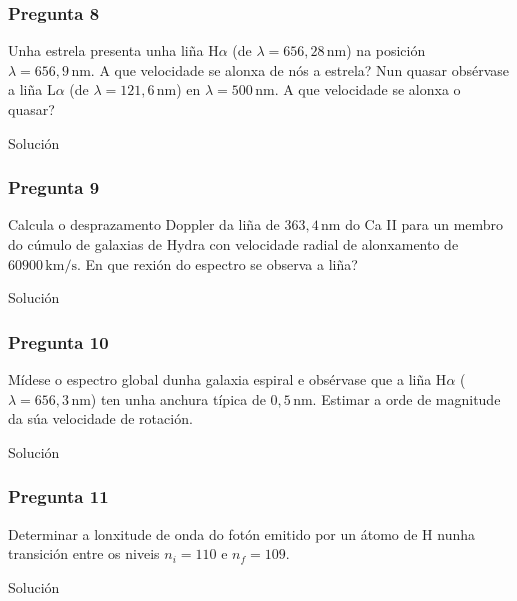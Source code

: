 \vspace*{2em}

\begin{Enunciado}
	\subsubsection{Pregunta 8}

	Unha estrela presenta unha liña H$\alpha$ (de $\lambda = 656{,}28\,\text{nm}$) na posición $\lambda = 656{,}9\,\text{nm}$. A que velocidade se alonxa de nós a estrela? Nun quasar obsérvase a liña L$\alpha$ (de $\lambda = 121{,}6\,\text{nm}$) en $\lambda = 500\,\text{nm}$. A que velocidade se alonxa o quasar?

\end{Enunciado}
Solución

\vspace*{2em}

\begin{Enunciado}
	\subsubsection{Pregunta 9}

	Calcula o desprazamento Doppler da liña de $363{,}4\,\text{nm}$ do Ca II para un membro do cúmulo de galaxias de Hydra con velocidade radial de alonxamento de $60900\,\text{km/s}$. En que rexión do espectro se observa a liña?

\end{Enunciado}
Solución

\vspace*{2em}

\begin{Enunciado}
	\subsubsection{Pregunta 10}

	Mídese o espectro global dunha galaxia espiral e obsérvase que a liña H$\alpha$ ($\lambda = 656{,}3\,\text{nm}$) ten unha anchura típica de $0{,}5\,\text{nm}$. Estimar a orde de magnitude da súa velocidade de rotación.

\end{Enunciado}
Solución

\vspace*{2em}

\begin{Enunciado}
	\subsubsection{Pregunta 11}

	Determinar a lonxitude de onda do fotón emitido por un átomo de H nunha transición entre os niveis $n_i = 110$ e $n_f = 109$.

\end{Enunciado}
Solución

